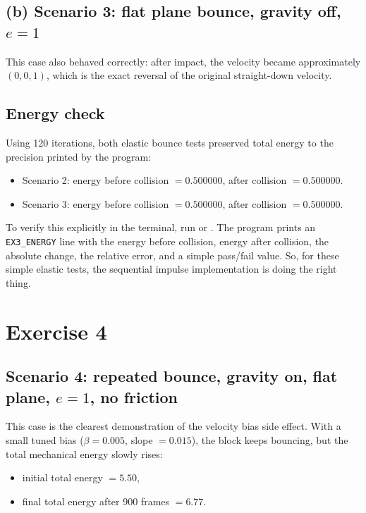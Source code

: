 \documentclass[11pt]{article}
\begin{document}
\subsection*{(b) Scenario 3: flat plane bounce, gravity off, $e=1$}
This case also behaved correctly: after impact, the velocity became approximately $(0,0,1)$, which is the exact reversal of the original straight-down velocity.

\subsection*{Energy check}
Using 120 iterations, both elastic bounce tests preserved total energy to the precision printed by the program:
\begin{itemize}
    \item Scenario 2: energy before collision $=0.500000$, after collision $=0.500000$.
    \item Scenario 3: energy before collision $=0.500000$, after collision $=0.500000$.
\end{itemize}
To verify this explicitly in the terminal, run
\texttt{}
or
\texttt{}.
The program prints an \texttt{EX3\_ENERGY} line with the energy before collision, energy after collision, the absolute change, the relative error, and a simple pass/fail value.
So, for these simple elastic tests, the sequential impulse implementation is doing the right thing.

\section*{Exercise 4}
\subsection*{Scenario 4: repeated bounce, gravity on, flat plane, $e=1$, no friction}
This case is the clearest demonstration of the velocity bias side effect. With a small tuned bias ($\beta = 0.005$, slope $=0.015$), the block keeps bouncing, but the total mechanical energy slowly rises:
\begin{itemize}
    \item initial total energy $=5.50$,
    \item final total energy after 900 frames $=6.77$.
\end{itemize}
\end{document}

